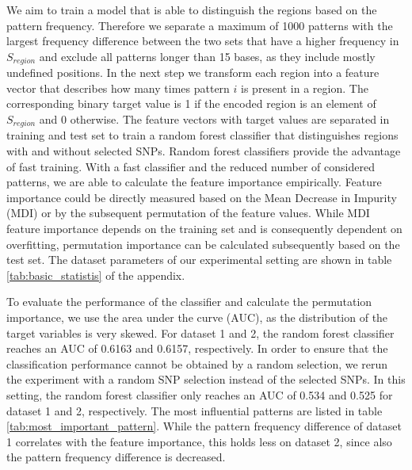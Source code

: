\documentclass{article}
\begin{document}
We aim to train a model that is able to distinguish the regions based on the pattern frequency. Therefore we separate a maximum of 1000 patterns with the largest frequency difference between the two sets that have a higher frequency in $S_{region}$ and exclude all patterns longer than 15 bases, as they include mostly undefined positions. In the next step we transform each region into a feature vector that describes how many times pattern $i$ is present in a region. The corresponding binary target value is 1 if the encoded region is an element of $S_{region}$ and 0 otherwise. The feature vectors with target values are separated in training and test set to train a random forest classifier that distinguishes regions with and without selected SNPs. %
Random forest classifiers provide the advantage of fast training. 
With a fast classifier and the reduced number of considered patterns, we are able to calculate the feature importance empirically. 
Feature importance could be directly measured based on the Mean Decrease in Impurity (MDI) \cite{breiman2001random} or by the subsequent permutation of the feature values. While MDI feature importance depends on the training set and is consequently dependent on overfitting, permutation importance can be calculated subsequently based on the test set. The dataset parameters of our experimental setting are shown in table \ref{tab:basic_statistis} of the appendix. 

To evaluate the performance of the classifier and calculate the permutation importance, we use the area under the curve (AUC), as the distribution of the target variables is very skewed. For dataset 1 and 2, the random forest classifier reaches an AUC of 0.6163 and 0.6157, respectively. 
In order to ensure that the classification performance cannot be obtained by a random selection, we rerun the experiment with a random SNP selection instead of the selected SNPs. In this setting, the random forest classifier only reaches an AUC of 0.534 and 0.525 for dataset 1 and 2, respectively. 
The most influential patterns are listed in table \ref{tab:most_important_pattern}. While the pattern frequency difference of dataset 1 correlates with the feature importance, this holds less on dataset 2, since also the pattern frequency difference is decreased.
\end{document}
